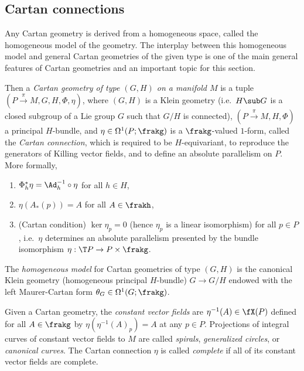 \subsection{Cartan connections}

Any Cartan geometry is derived from a homogeneous space, called the homogeneous model of the geometry. The interplay between this homogeneous model and general Cartan geometries of the given type is one of the main general features of Cartan geometries and an important topic for this section.


\begin{defn}\label{def cartan geometry I}
    Then a \emph{Cartan geometry of type $(G,H)$ on a manifold $M$} is a tuple $(P\overset{\pi}{\to}M,G,H,\Phi,\eta)$, where $(G,H)$ is a Klein geometry (i.e.\ $H\sub G$ is a closed subgroup of a Lie group $G$ such that $G\slash H$ is connected),
    $(P\overset{\pi}{\to}M,H,\Phi)$ a principal $H$-bundle, and $\eta\in\Omega^1(P;\frakg)$ is a $\frakg$-valued $1$-form, called the \emph{Cartan connection}, which is required to be $H$-equivariant, to reproduce the generators of Killing vector fields, and to define an absolute parallelism on $P$. More formally,
    \begin{enumerate}
        \item $\Phi_h^\ast \eta=\Ad_h^{-1}\circ \eta$ for all $h\in H$,
        \item $\eta(A_\ast(p))=A$ for all $A\in\frakh$,
        \item (Cartan condition) $\ker\eta_p=0$ (hence $\eta_p$ is a linear isomorphism) for all $p\in P$, i.e.\ $\eta$ determines an absolute parallelism presented by the bundle isomorphism $\eta:\T P\to P\times\frakg$.
    \end{enumerate}
    The \emph{homogeneous model} for Cartan geometries of type $(G,H)$ is the canonical Klein geometry (homogeneous principal $H$-bundle) $G\to G\slash H$ endowed with the left Maurer-Cartan form $\theta_G\in\Omega^1(G;\frakg)$.

    Given a Cartan geometry, the \emph{constant vector fields} are $\eta^{-1}(A)\in\fX(P)$ defined for all $A\in\frakg$ by $\eta(\eta^{-1}(A)_p)=A$ at any $p\in P$. Projections of integral curves of constant vector fields to $M$ are called \emph{spirals}, \emph{generalized circles}, or \emph{canonical curves}. The Cartan connection $\eta$ is called \emph{complete} if all of its constant vector fields are complete.
\end{defn}

